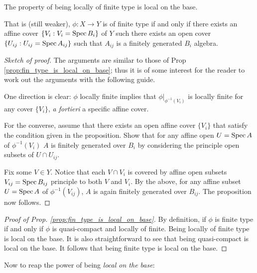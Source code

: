 \begin{prop}
The property of being locally of finite type is local on the base.

That is (still weaker), $\phi: X \to Y$ is of finite type if and 
only if there exists an affine cover $\{V_i : V_i = \mathrm{Spec}\, B_i\}$ 
of $Y$ such there exists an open cover $\{U_{ij} : U_{ij} = \mathrm{Spec}\, 
A_{ij}\}$ such that $A_{ij}$ is a finitely generated $B_i$ 
algebra.
\end{prop}
\begin{proof}[Sketch of proof]
The arguments are similar to those of Prop 
\ref{prop:fin_type_is_local_on_base}; thus it is of some interest
for the reader to work out the arguments with the following guide.

One direction is clear: $\phi$ locally finite implies that 
$\phi|_{\phi^{-1}(V_i)}$ is locally finite for any cover $\{V_i\}$,
\emph{a fortieri} a specific affine cover.

For the converse, assume that there exists an open affine cover 
$\{V_i\}$ that satisfy the condition given in the proposition.
Show that for any affine open $U = \mathrm{Spec}\, A$ of $\phi^{-1}(V_i)$
$A$ is finitely generated over $B_i$ by considering the principle
open subsets of $U \cap U_{ij}$.

Fix some $V \in Y$. Notice that each $V \cap V_i$ is covered by
affine open subsets $V_{ij} = \mathrm{Spec}\, B_{ij}$ principle to both $V$ 
and $V_i$. By the above, for any affine subset $U = \mathrm{Spec}\, A$ of 
$\phi^{-1}(V_{ij})$, $A$ is again finitely generated over $B_{ij}$.
The proposition now follows.
\end{proof}

\begin{proof}[Proof of Prop. \ref{prop:fin_type_is_local_on_base}]
By definition, if $\phi$ is finite type if and only if $\phi$ is 
quasi-compact and locally of finite. Being locally of finite type
is local on the base. It is also straightforward to see that being 
quasi-compact is local on the base. It follows that being finite
type is local on the base.
\end{proof}

Now to reap the power of being \emph{local on the base}:


